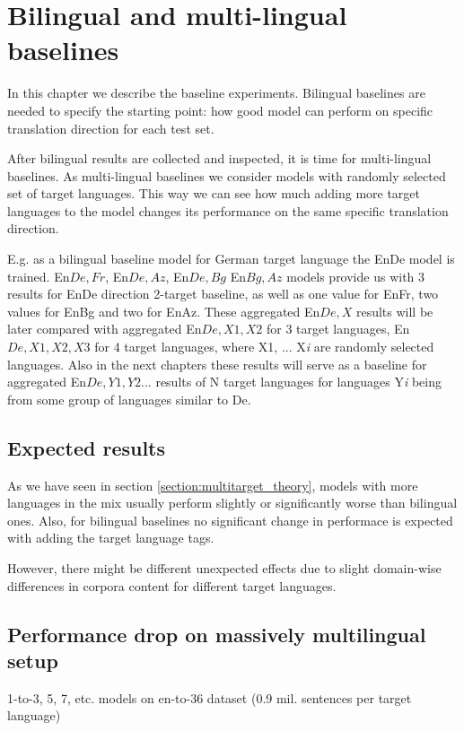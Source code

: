 \chapter{Bilingual and multi-lingual baselines}

In this chapter we describe the baseline experiments.
Bilingual baselines are needed to specify the starting point:
how good model can perform on specific translation direction
for each test set.

After bilingual results are collected and inspected, it is time for
multi-lingual baselines. As multi-lingual baselines we consider models
with randomly selected set of target languages. This way we can see
how much adding more target languages to the model changes its performance
on the same specific translation direction.

E.g. as a bilingual baseline model for German target language the En\to{}De
model is trained.
En\to{}${De,Fr}$, En\to{}${De,Az}$, En\to{}${De,Bg}$ En\to{}${Bg,Az}$ models
provide us with 3 results for En\to{}De direction 2-target baseline, as well
as one value for En\to{}Fr, two values for En\to{}Bg and two for En\to{}Az.
These aggregated En\to{}${De,X}$ results will be later compared with
aggregated En\to{}${De,X1,X2}$ for 3 target languages,
En\to{}${De,X1,X2,X3}$ for 4 target languages, where X1, ... X\textit{i} are
randomly selected languages.
Also in the next chapters these results will serve as a baseline for
aggregated En\to{}${De,Y1,Y2...}$ results of N target languages for languages
Y\textit{i} being from some group of languages similar to De.

\section{Expected results}

As we have seen in section \ref{section:multitarget_theory}, models with more languages
in the mix usually perform slightly or significantly worse than bilingual ones.
Also, for bilingual baselines no significant change in performace is expected with adding
the target language tags.

However, there might be different unexpected effects due to slight domain-wise differences
in corpora content for different target languages.

\section{Performance drop on massively multilingual setup}
1-to-3, 5, 7, etc. models on en-to-36 dataset (0.9 mil. sentences per target language)

